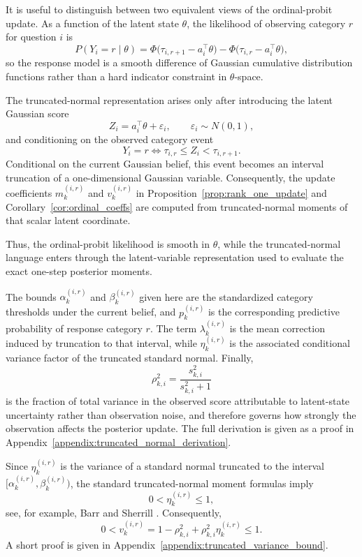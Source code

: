 \documentclass{article}
\begin{document}
\begin{remark}
It is useful to distinguish between two equivalent views of the ordinal-probit
update. As a function of the latent state $\theta$, the likelihood of observing
category $r$ for question $i$ is
\[
P(Y_i = r \mid \theta)
=
\Phi\!\bigl(\tau_{i,r+1} - a_i^\top \theta\bigr)
-
\Phi\!\bigl(\tau_{i,r} - a_i^\top \theta\bigr),
\]
so the response model is a smooth difference of Gaussian cumulative distribution
functions rather than a hard indicator constraint in $\theta$-space.

The truncated-normal representation arises only after introducing the latent
Gaussian score
\[
Z_i = a_i^\top \theta + \varepsilon_i,
\qquad
\varepsilon_i \sim N(0,1),
\]
and conditioning on the observed category event
\[
Y_i = r
\iff
\tau_{i,r} \le Z_i < \tau_{i,r+1}.
\]
Conditional on the current Gaussian belief, this event becomes an interval
truncation of a one-dimensional Gaussian variable. Consequently, the update
coefficients $m_k^{(i,r)}$ and $v_k^{(i,r)}$ in Proposition~\ref{prop:rank_one_update}
and Corollary~\ref{cor:ordinal_coeffs} are computed from truncated-normal moments
of that scalar latent coordinate.

Thus, the ordinal-probit likelihood is smooth in $\theta$, while the
truncated-normal language enters through the latent-variable representation used
to evaluate the exact one-step posterior moments.
\end{remark}
The bounds $\alpha_k^{(i,r)}$ and $\beta_k^{(i,r)}$ given here are the standardized category
thresholds under the current belief, and $p_k^{(i,r)}$ is the corresponding predictive probability
of response category $r$. The term $\lambda_k^{(i,r)}$ is the mean correction induced by
truncation to that interval, while $\eta_k^{(i,r)}$ is the associated conditional variance factor of
the truncated standard normal. Finally,
\begin{equation*}
\rho_{k,i}^2 = \frac{s_{k,i}^2}{s_{k,i}^2+1}
\end{equation*}
is the fraction of total variance in the observed score attributable to latent-state uncertainty
rather than observation noise, and therefore governs how strongly the observation affects the
posterior update. The full derivation is given as a proof in
Appendix~\ref{appendix:truncated_normal_derivation}.

\begin{remark}\label{rem:vle1}
Since $\eta_k^{(i,r)}$ is the variance of a standard normal truncated to the interval
$[\alpha_k^{(i,r)},\beta_k^{(i,r)})$,  the standard truncated-normal
moment formulas imply
\begin{equation*}
0<\eta_k^{(i,r)}\le 1,
\end{equation*}
see, for example, Barr and Sherrill \cite{barr1999mean}. Consequently,
\begin{equation*}
0<v_k^{(i,r)}=1-\rho_{k,i}^2+\rho_{k,i}^2\eta_k^{(i,r)}\le 1.
\end{equation*}
A short proof is given in Appendix~\ref{appendix:truncated_variance_bound}.
\end{remark}
\end{document}
